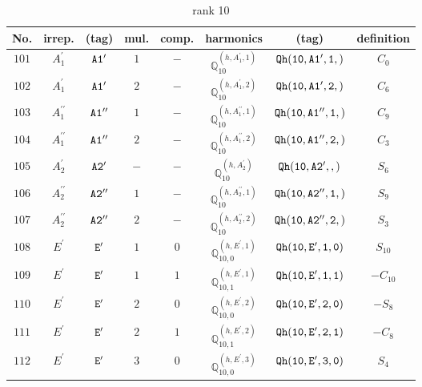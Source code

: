 \documentclass[fleqn,8pt]{jsarticle}
\begin{document}
\begin{table}[ht!]
\begin{center}
\caption{rank 10}
\renewcommand{\arraystretch}{1.3}
\begin{tabular}{cccccccc} \hline \hline
No. & irrep. & (tag) & mul. & comp. & harmonics & (tag) & definition \\ \hline
$ 101 $ & $ A_{1}^{\prime} $ & $ {\tt A1'} $ & $ 1 $ & $ - $ & $ \mathbb{Q}_{10}^{(h,A_{1}^{\prime},1)} $ & $ {\tt Qh(10,A1',1,)} $ & $ C_{0} $ \\
$ 102 $ & $ A_{1}^{\prime} $ & $ {\tt A1'} $ & $ 2 $ & $ - $ & $ \mathbb{Q}_{10}^{(h,A_{1}^{\prime},2)} $ & $ {\tt Qh(10,A1',2,)} $ & $ C_{6} $ \\
$ 103 $ & $ A_{1}^{\prime\prime} $ & $ {\tt A1''} $ & $ 1 $ & $ - $ & $ \mathbb{Q}_{10}^{(h,A_{1}^{\prime\prime},1)} $ & $ {\tt Qh(10,A1'',1,)} $ & $ C_{9} $ \\
$ 104 $ & $ A_{1}^{\prime\prime} $ & $ {\tt A1''} $ & $ 2 $ & $ - $ & $ \mathbb{Q}_{10}^{(h,A_{1}^{\prime\prime},2)} $ & $ {\tt Qh(10,A1'',2,)} $ & $ C_{3} $ \\
$ 105 $ & $ A_{2}^{\prime} $ & $ {\tt A2'} $ & $ - $ & $ - $ & $ \mathbb{Q}_{10}^{(h,A_{2}^{\prime})} $ & $ {\tt Qh(10,A2',,)} $ & $ S_{6} $ \\
$ 106 $ & $ A_{2}^{\prime\prime} $ & $ {\tt A2''} $ & $ 1 $ & $ - $ & $ \mathbb{Q}_{10}^{(h,A_{2}^{\prime\prime},1)} $ & $ {\tt Qh(10,A2'',1,)} $ & $ S_{9} $ \\
$ 107 $ & $ A_{2}^{\prime\prime} $ & $ {\tt A2''} $ & $ 2 $ & $ - $ & $ \mathbb{Q}_{10}^{(h,A_{2}^{\prime\prime},2)} $ & $ {\tt Qh(10,A2'',2,)} $ & $ S_{3} $ \\
$ 108 $ & $ E^{\prime} $ & $ {\tt E'} $ & $ 1 $ & $ 0 $ & $ \mathbb{Q}_{10,0}^{(h,E^{\prime},1)} $ & $ {\tt Qh(10,E',1,0)} $ & $ S_{10} $ \\
$ 109 $ & $ E^{\prime} $ & $ {\tt E'} $ & $ 1 $ & $ 1 $ & $ \mathbb{Q}_{10,1}^{(h,E^{\prime},1)} $ & $ {\tt Qh(10,E',1,1)} $ & $ - C_{10} $ \\
$ 110 $ & $ E^{\prime} $ & $ {\tt E'} $ & $ 2 $ & $ 0 $ & $ \mathbb{Q}_{10,0}^{(h,E^{\prime},2)} $ & $ {\tt Qh(10,E',2,0)} $ & $ - S_{8} $ \\
$ 111 $ & $ E^{\prime} $ & $ {\tt E'} $ & $ 2 $ & $ 1 $ & $ \mathbb{Q}_{10,1}^{(h,E^{\prime},2)} $ & $ {\tt Qh(10,E',2,1)} $ & $ - C_{8} $ \\
$ 112 $ & $ E^{\prime} $ & $ {\tt E'} $ & $ 3 $ & $ 0 $ & $ \mathbb{Q}_{10,0}^{(h,E^{\prime},3)} $ & $ {\tt Qh(10,E',3,0)} $ & $ S_{4} $ \\

\end{tabular}
\end{center}
\end{table}
\end{document}
